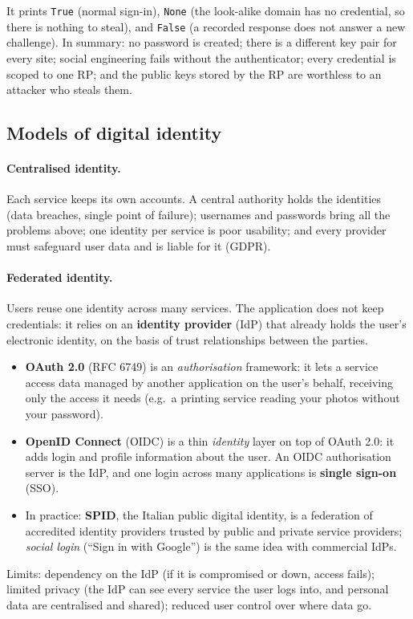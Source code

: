 It prints \texttt{True} (normal sign-in), \texttt{None} (the look-alike domain has no credential, so there is nothing to steal), and \texttt{False} (a recorded response does not answer a new challenge). In summary: no password is created; there is a different key pair for every site; social engineering fails without the authenticator; every credential is scoped to one RP; and the public keys stored by the RP are worthless to an attacker who steals them.

\subsection{Models of digital identity}

\paragraph{Centralised identity.} Each service keeps its own accounts. A central authority holds the identities (data breaches, single point of failure); usernames and passwords bring all the problems above; one identity per service is poor usability; and every provider must safeguard user data and is liable for it (GDPR).

\paragraph{Federated identity.} Users reuse one identity across many services. The application does not keep credentials: it relies on an \textbf{identity provider} (IdP) that already holds the user's electronic identity, on the basis of trust relationships between the parties.
\begin{itemize}
    \item \textbf{OAuth 2.0} (RFC 6749) is an \emph{authorisation} framework: it lets a service access data managed by another application on the user's behalf, receiving only the access it needs (e.g.\ a printing service reading your photos without your password).
    \item \textbf{OpenID Connect} (OIDC) is a thin \emph{identity} layer on top of OAuth 2.0: it adds login and profile information about the user. An OIDC authorisation server is the IdP, and one login across many applications is \textbf{single sign-on} (SSO).
    \item In practice: \textbf{SPID}, the Italian public digital identity, is a federation of accredited identity providers trusted by public and private service providers; \emph{social login} (\enquote{Sign in with Google}) is the same idea with commercial IdPs.
\end{itemize}
Limits: dependency on the IdP (if it is compromised or down, access fails); limited privacy (the IdP can see every service the user logs into, and personal data are centralised and shared); reduced user control over where data go.

